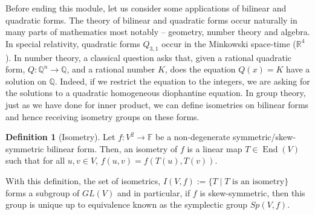 \documentclass[
]{article}
\theoremstyle{definition}
\theoremstyle{definition}
\newtheorem{definition}{Definition}[section]
\begin{document}
Before ending this module, let us consider some applications of bilinear
and quadratic forms. The theory of bilinear and quadratic forms occur
naturally in many parts of mathematics most notably -- geometry, number
theory and algebra. In special relativity, quadratic forms \(Q_{3, 1}\)
occur in the Minkowski space-time (\(\mathbb{R}^4\)). In number theory,
a classical question asks that, given a rational quadratic form,
\(Q : \mathbb{Q}^n \to \mathbb{Q}\), and a rational number \(K\), does
the equation \(Q(x) = K\) have a solution on \(\mathbb{Q}\). Indeed, if
we restrict the equation to the integers, we are asking for the
solutions to a quadratic homogeneous diophantine equation. In group
theory, just as we have done for inner product, we can define isometries
on bilinear forms and hence receiving isometry groups on these forms.

\begin{definition}[Isometry]
  Let \(f : V^2 \to \mathbb{F}\) be a non-degenerate symmetric/skew-symmetric 
  bilinear form. Then, an isometry of \(f\) is a linear map \(T \in \mathop{\mathrm{End}}(V)\) 
  such that for all \(u, v \in V\), \(f(u, v) = f(T(u), T(v))\).
\end{definition}

With this definition, the set of isometrics,
\(I(V, f) := \{T \mid T \text{ is an isometry}\}\) forms a subgroup of
\(GL(V)\) and in particular, if \(f\) is skew-symmetric, then this group
is unique up to equivalence known as the symplectic group \(Sp(V, f)\).
\end{document}
